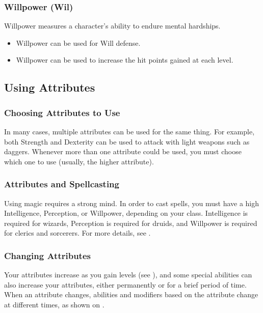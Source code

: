 \subsubsection{Willpower (Wil)}
Willpower measures a character's ability to endure mental hardships.
\begin{itemize}
    \item Willpower can be used for Will defense.
    \item Willpower can be used to increase the hit points gained at each level.
\end{itemize}

\subsection{Using Attributes}

\subsubsection{Choosing Attributes to Use}
In many cases, multiple attributes can be used for the same thing. For example, both Strength and Dexterity can be used to attack with light weapons such as daggers. Whenever more than one attribute could be used, you must choose which one to use (usually, the higher attribute).

\subsubsection{Attributes and Spellcasting}
Using magic requires a strong mind. In order to cast spells, you must have a high Intelligence, Perception, or Willpower, depending on your class. Intelligence is required for wizards, Perception is required for druids, and Willpower is required for clerics and sorcerers. For more details, see .

\subsubsection{Changing Attributes}

Your attributes increase as you gain levels (see ), and some special abilities can also increase your attributes, either permanently or for a brief period of time.
When an attribute changes, abilities and modifiers based on the attribute change at different times, as shown on .

